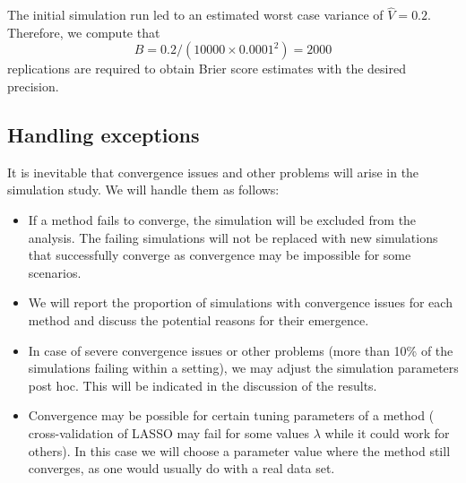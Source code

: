 The initial simulation run led to an estimated worst case variance of
$\widehat{V} = 0.2$. Therefore, we compute that
$$B = 0.2/(10000 \times 0.0001^{2}) = 2000$$
replications are required to obtain Brier score estimates with the
desired precision.

\subsection{Handling exceptions} \label{sec:exceptions}
It is inevitable that convergence issues and other problems will arise
in the simulation study. We will handle them as follows:
\begin{itemize}
  \item If a method fails to converge, the simulation will be excluded from the
  analysis. The failing simulations will not be replaced with new simulations that
  successfully converge as convergence may be impossible for some scenarios.
  \item We will report the proportion of simulations with convergence issues
  for each method and discuss the potential reasons for their emergence.
  \item In case of severe convergence issues or other problems (more than 10\% of the
  simulations failing within a setting), we may adjust
  the simulation parameters post hoc. This will be indicated in the discussion of
  the results.
  \item Convergence may be possible for certain tuning parameters of a method
  (\eg{} cross-validation of LASSO may fail for some values $\lambda$ while it could
  work for others). In this case we will choose a parameter value where the method
  still converges, as one would usually do with a real data set.

\end{itemize}

